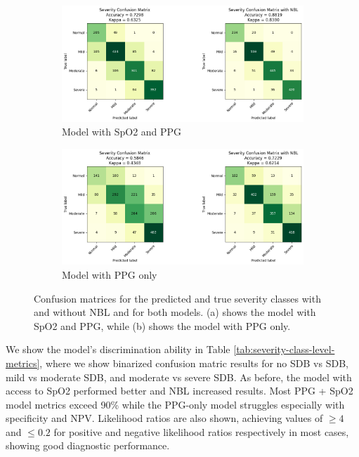 \begin{figure}
      \begin{subfigure}{\textwidth}
          \includegraphics[width=\textwidth]{images/SevClassConfMatrix}
          \caption{Model with SpO2 and PPG}
      \end{subfigure}
      \begin{subfigure}{\textwidth}
          \includegraphics[width=\textwidth]{images/SevClassConfMatrixNoSpO2}
          \caption{Model with PPG only}
      \end{subfigure}
    \caption{Confusion matrices for the predicted and true severity classes with and without NBL and for both models. (a) shows the model with SpO2 and PPG, while (b) shows the model with PPG only.}
    \label{fig:severity-class-level-confusion-matrices}
\end{figure}

We show the model's discrimination ability in Table \ref{tab:severity-class-level-metrics}, where we show binarized confusion matric results for no SDB vs SDB, mild vs moderate SDB, and moderate vs severe SDB. As before, the model with access to SpO2 performed better and NBL increased results. Most PPG + SpO2 model metrics exceed 90\% while the PPG-only model struggles especially with specificity and NPV. Likelihood ratios are also shown, achieving values of $\geq 4$ and $\leq 0.2$ for positive and negative likelihood ratios respectively in most cases, showing good diagnostic performance.

